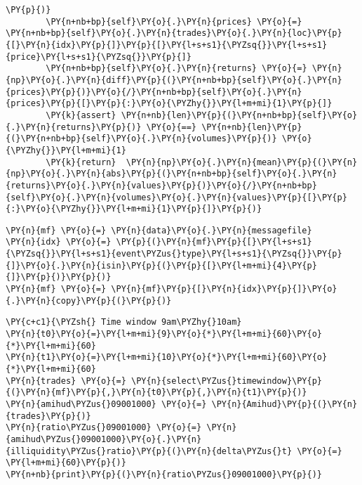 \documentclass[11pt]{article}
\begin{document}
\begin{tcolorbox}[breakable, size=fbox, boxrule=1pt, pad at break*=1mm,colback=cellbackground, colframe=cellborder]
\begin{Verbatim}[commandchars=\\\{\}]
        \PY{p}{)}
        \PY{n+nb+bp}{self}\PY{o}{.}\PY{n}{prices} \PY{o}{=} \PY{n+nb+bp}{self}\PY{o}{.}\PY{n}{trades}\PY{o}{.}\PY{n}{loc}\PY{p}{[}\PY{n}{idx}\PY{p}{]}\PY{p}{[}\PY{l+s+s1}{\PYZsq{}}\PY{l+s+s1}{price}\PY{l+s+s1}{\PYZsq{}}\PY{p}{]}
        \PY{n+nb+bp}{self}\PY{o}{.}\PY{n}{returns} \PY{o}{=} \PY{n}{np}\PY{o}{.}\PY{n}{diff}\PY{p}{(}\PY{n+nb+bp}{self}\PY{o}{.}\PY{n}{prices}\PY{p}{)}\PY{o}{/}\PY{n+nb+bp}{self}\PY{o}{.}\PY{n}{prices}\PY{p}{[}\PY{p}{:}\PY{o}{\PYZhy{}}\PY{l+m+mi}{1}\PY{p}{]}
        \PY{k}{assert} \PY{n+nb}{len}\PY{p}{(}\PY{n+nb+bp}{self}\PY{o}{.}\PY{n}{returns}\PY{p}{)} \PY{o}{==} \PY{n+nb}{len}\PY{p}{(}\PY{n+nb+bp}{self}\PY{o}{.}\PY{n}{volumes}\PY{p}{)} \PY{o}{\PYZhy{}}\PY{l+m+mi}{1}
        \PY{k}{return}  \PY{n}{np}\PY{o}{.}\PY{n}{mean}\PY{p}{(}\PY{n}{np}\PY{o}{.}\PY{n}{abs}\PY{p}{(}\PY{n+nb+bp}{self}\PY{o}{.}\PY{n}{returns}\PY{o}{.}\PY{n}{values}\PY{p}{)}\PY{o}{/}\PY{n+nb+bp}{self}\PY{o}{.}\PY{n}{volumes}\PY{o}{.}\PY{n}{values}\PY{p}{[}\PY{p}{:}\PY{o}{\PYZhy{}}\PY{l+m+mi}{1}\PY{p}{]}\PY{p}{)}
\end{Verbatim}
\end{tcolorbox}

    \begin{tcolorbox}[breakable, size=fbox, boxrule=1pt, pad at break*=1mm,colback=cellbackground, colframe=cellborder]
\begin{Verbatim}[commandchars=\\\{\}]
\PY{n}{mf} \PY{o}{=} \PY{n}{data}\PY{o}{.}\PY{n}{messagefile}
\PY{n}{idx} \PY{o}{=} \PY{p}{(}\PY{n}{mf}\PY{p}{[}\PY{l+s+s1}{\PYZsq{}}\PY{l+s+s1}{event\PYZus{}type}\PY{l+s+s1}{\PYZsq{}}\PY{p}{]}\PY{o}{.}\PY{n}{isin}\PY{p}{(}\PY{p}{[}\PY{l+m+mi}{4}\PY{p}{]}\PY{p}{)}\PY{p}{)}
\PY{n}{mf} \PY{o}{=} \PY{n}{mf}\PY{p}{[}\PY{n}{idx}\PY{p}{]}\PY{o}{.}\PY{n}{copy}\PY{p}{(}\PY{p}{)}
\end{Verbatim}
\end{tcolorbox}

    \begin{tcolorbox}[breakable, size=fbox, boxrule=1pt, pad at break*=1mm,colback=cellbackground, colframe=cellborder]
\begin{Verbatim}[commandchars=\\\{\}]
\PY{c+c1}{\PYZsh{} Time window 9am\PYZhy{}10am}
\PY{n}{t0}\PY{o}{=}\PY{l+m+mi}{9}\PY{o}{*}\PY{l+m+mi}{60}\PY{o}{*}\PY{l+m+mi}{60}
\PY{n}{t1}\PY{o}{=}\PY{l+m+mi}{10}\PY{o}{*}\PY{l+m+mi}{60}\PY{o}{*}\PY{l+m+mi}{60}
\PY{n}{trades} \PY{o}{=} \PY{n}{select\PYZus{}timewindow}\PY{p}{(}\PY{n}{mf}\PY{p}{,}\PY{n}{t0}\PY{p}{,}\PY{n}{t1}\PY{p}{)}
\PY{n}{amihud\PYZus{}09001000} \PY{o}{=} \PY{n}{Amihud}\PY{p}{(}\PY{n}{trades}\PY{p}{)}
\PY{n}{ratio\PYZus{}09001000} \PY{o}{=} \PY{n}{amihud\PYZus{}09001000}\PY{o}{.}\PY{n}{illiquidity\PYZus{}ratio}\PY{p}{(}\PY{n}{delta\PYZus{}t} \PY{o}{=} \PY{l+m+mi}{60}\PY{p}{)}
\PY{n+nb}{print}\PY{p}{(}\PY{n}{ratio\PYZus{}09001000}\PY{p}{)}
\end{Verbatim}
\end{tcolorbox}
\end{document}
